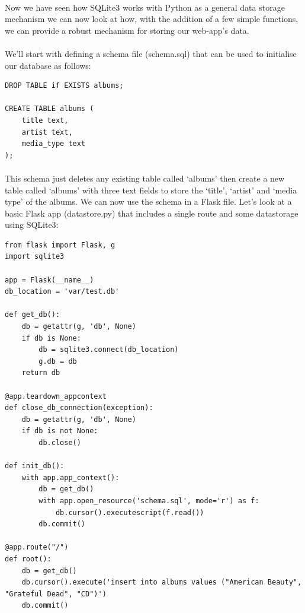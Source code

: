 \documentclass[12pt, a4paper, oneside]{book}
\begin{document}
{\paragraph{} Now we have seen how SQLite3 works with Python as a general data storage mechanism we can now look at how, with the addition of a few simple functions, we can provide a robust mechanism for storing our web-app's data.

\paragraph{} We'll start with defining a schema file (schema.sql) that can be used to initialise our database as follows:

\begin{lstlisting}
DROP TABLE if EXISTS albums;

CREATE TABLE albums (
    title text,
    artist text,
    media_type text
);
\end{lstlisting}

\paragraph{} This schema just deletes any existing table called `albums' then create a new table called `albums' with three text fields to store the `title', `artist' and `media type' of the albums. We can now use the schema in a Flask file. Let's look at a basic Flask app (datastore.py) that includes a single route and some datastorage using SQLite3:

\begin{lstlisting}
from flask import Flask, g
import sqlite3

app = Flask(__name__)
db_location = 'var/test.db'

def get_db():
    db = getattr(g, 'db', None)
    if db is None:
        db = sqlite3.connect(db_location)
        g.db = db
    return db

@app.teardown_appcontext
def close_db_connection(exception):
    db = getattr(g, 'db', None)
    if db is not None:
        db.close()

def init_db():
    with app.app_context():
        db = get_db() 
        with app.open_resource('schema.sql', mode='r') as f:
            db.cursor().executescript(f.read())
        db.commit()

@app.route("/")
def root():
    db = get_db()
    db.cursor().execute('insert into albums values ("American Beauty", "Grateful Dead", "CD")')
    db.commit()


\end{lstlisting}}
\end{document}
